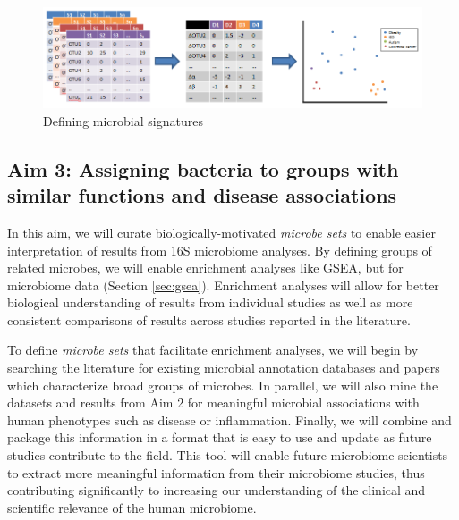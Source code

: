\documentclass[12pt]{article}
\begin{document}
\begin{figure}[H]
\begin{center}
\includegraphics[scale=0.5]{microbial_signatures}
\caption{Defining microbial signatures}\label{fig:microbe_signatures}
\end{center}
\end{figure}

\subsection{Aim 3: Assigning bacteria to groups with similar functions and disease associations}

In this aim, we will curate biologically-motivated \textit{microbe 
sets} to enable easier interpretation of results from 16S microbiome 
analyses. By defining groups of related microbes, we 
will enable enrichment analyses like GSEA, but for microbiome data (Section \ref{sec:gsea}). Enrichment analyses will allow for better 
biological understanding of results from individual studies as well as 
more consistent comparisons of results across studies reported in 
the literature.

To define \textit{microbe sets} that facilitate enrichment analyses, we will
begin by searching the literature for existing microbial annotation
databases and papers which characterize broad groups of microbes.
In parallel, we will also mine the datasets and results from Aim 2
for meaningful microbial associations with human phenotypes such as
disease or inflammation. Finally, we will combine and package this information
in a format that is easy to use and update as future studies contribute
to the field. This tool will enable future microbiome scientists to extract more
meaningful information from their microbiome studies, thus
contributing significantly to increasing our understanding of the
clinical and scientific relevance of the human microbiome.
\end{document}
